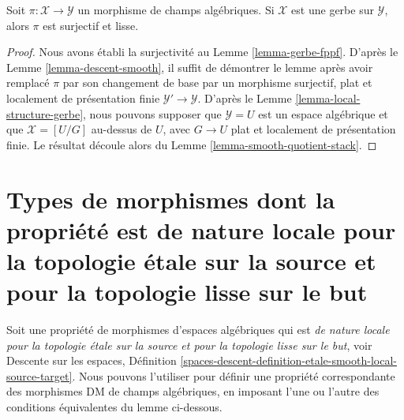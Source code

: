 \begin{lemma}
\label{lemma-gerbe-smooth}
Soit $\pi : \mathcal{X} \to \mathcal{Y}$ un morphisme de champs algébriques.
Si $\mathcal{X}$ est une gerbe sur $\mathcal{Y}$, alors $\pi$ est surjectif
et lisse.
\end{lemma}

\begin{proof}
Nous avons établi la surjectivité au Lemme \ref{lemma-gerbe-fppf}.
D'après le Lemme \ref{lemma-descent-smooth},
il suffit de démontrer le lemme après avoir remplacé $\pi$ par son changement de base
par un morphisme surjectif, plat et localement de présentation finie
$\mathcal{Y}' \to \mathcal{Y}$. D'après le
Lemme \ref{lemma-local-structure-gerbe},
nous pouvons supposer que $\mathcal{Y} = U$ est un espace algébrique et que
$\mathcal{X} = [U/G]$ au-dessus de $U$, avec $G \to U$ plat et
localement de présentation finie.
Le résultat découle alors du Lemme \ref{lemma-smooth-quotient-stack}.
\end{proof}




\section{Types de morphismes dont la propriété est de nature locale pour la topologie \'etale sur la source et pour la topologie lisse sur le but}
\label{section-etale-smooth-local-source-target}

\noindent
Soit une propriété de morphismes d'espaces algébriques qui est
{\it de nature locale pour la topologie \'etale sur la source et pour la topologie lisse sur le but}, voir
Descente sur les espaces,
Définition \ref{spaces-descent-definition-etale-smooth-local-source-target}.
Nous pouvons l'utiliser pour définir une propriété correspondante
des morphismes DM de champs algébriques, en imposant l'une ou l'autre
des conditions équivalentes du lemme ci-dessous.

